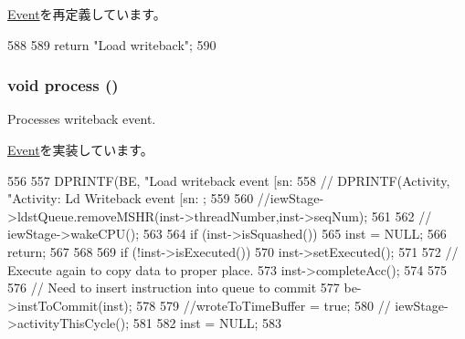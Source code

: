 \hyperlink{classEvent_a130ddddf003422b413e2e891b1b80e8f}{Event}を再定義しています。


\begin{DoxyCode}
588 {
589     return "Load writeback";
590 }
\end{DoxyCode}
\hypertarget{classBackEnd_1_1LdWritebackEvent_a2e9c5136d19b1a95fc427e0852deab5c}{
\subsubsection[{process}]{\setlength{\rightskip}{0pt plus 5cm}void process ()}}
\label{classBackEnd_1_1LdWritebackEvent_a2e9c5136d19b1a95fc427e0852deab5c}
Processes writeback event. 

\hyperlink{classEvent_a142b75b68a6291400e20fb0dd905b1c8}{Event}を実装しています。


\begin{DoxyCode}
556 {
557     DPRINTF(BE, "Load writeback event [sn:%
558 //    DPRINTF(Activity, "Activity: Ld Writeback event [sn:%
      ;
559 
560     //iewStage->ldstQueue.removeMSHR(inst->threadNumber,inst->seqNum);
561 
562 //    iewStage->wakeCPU();
563 
564     if (inst->isSquashed()) {
565         inst = NULL;
566         return;
567     }
568 
569     if (!inst->isExecuted()) {
570         inst->setExecuted();
571 
572         // Execute again to copy data to proper place.
573         inst->completeAcc();
574     }
575 
576     // Need to insert instruction into queue to commit
577     be->instToCommit(inst);
578 
579     //wroteToTimeBuffer = true;
580 //    iewStage->activityThisCycle();
581 
582     inst = NULL;
583 }
\end{DoxyCode}


